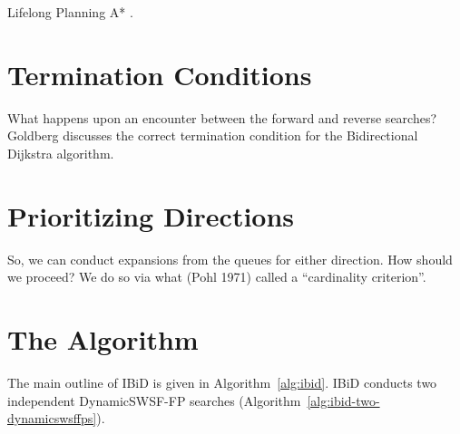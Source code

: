 \documentclass[nobib]{tufte-book}
\begin{document}
Lifelong Planning A* \citep{koenig2004lpastar}.

\section{Termination Conditions}

What happens upon an encounter between the forward and reverse searches?
Goldberg \citep{goldberg2005spexternalmemory}
discusses the correct termination condition for the 
Bidirectional Dijkstra algorithm.

\section{Prioritizing Directions}

So, we can conduct expansions from the queues for either direction.
How should we proceed?
We do so via what (Pohl 1971) called a ``cardinality criterion''.

\section{The Algorithm}

The main outline of IBiD is given in Algorithm~\ref{alg:ibid}.
IBiD conducts two independent DynamicSWSF-FP searches
(Algorithm~\ref{alg:ibid-two-dynamicswsffps}).
\end{document}
